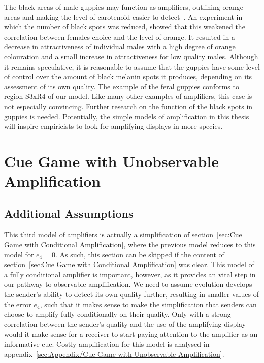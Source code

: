 \documentclass[a4paper,12pt]{article}
\numberwithin{equation}{section}
\begin{document}
The black areas of male guppies may function as amplifiers, outlining orange areas and making the level of carotenoid easier to detect~\cite{Brooks1996}. An experiment in which the number of black spots was reduced, showed that this weakened the correlation between females choice and the level of orange. It resulted in a decrease in attractiveness of individual males with a high degree of orange colouration and a small increase in attractiveness for low quality males. Although it remains speculative, it is reasonable to assume that the guppies have some level of control over the amount of black melanin spots it produces, depending on its assessment of its own quality. The example of the feral guppies conforms to region S3xR4 of our model. Like many other examples of amplifiers, this case is not especially convincing. Further research on the function of the black spots in guppies is needed. Potentially, the simple models of amplification in this thesis will inspire empiricists to look for amplifying displays in more species.

\newpage\clearpage


\section{Cue Game with Unobservable Amplification}
\label{sec:Cue Game with Unobservable Amplification}
\subsection{Additional Assumptions}
\label{sec:Cue Game with Unobservable Amplification/Additional Assumptions}

This third model of amplifiers is actually a simplification of section~\ref{sec:Cue Game with Conditional Amplification}, where the previous model reduces to this model for $e_{4} = 0$. As such, this section can be skipped if the content of section~\ref{sec:Cue Game with Conditional Amplification} was clear. This model of a fully conditional amplifier is important, however, as it provides an vital step in our pathway to observable amplification. We need to assume evolution develops the sender's ability to detect its own quality further, resulting in smaller values of the error $e_{4}$, such that it makes sense to make the simplification that senders can choose to amplify fully conditionally on their quality. Only with a strong correlation between the sender's quality and the use of the amplifying display would it make sense for a receiver to start paying attention to the amplifier as an informative cue. Costly amplification for this model is analysed in appendix~\ref{sec:Appendix/Cue Game with Unobservable Amplification}.
\end{document}

